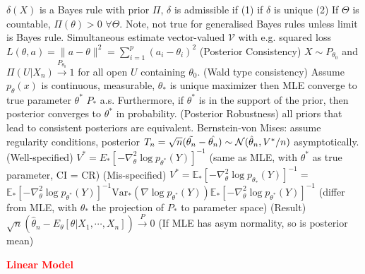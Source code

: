 \documentclass{article}
\renewcommand{\section}[1]{\textcolor{red}{\textbf{#1}}}
\renewcommand{\subsection}[1]{\text{\hl{[#1]}}}
\newcommand{\compact}{\nolinebreak}
\begin{document}
\subsection{Admissibility}
$\delta(X)$ is a Bayes rule with prior $\Pi$, $\delta$ is admissible if
(1) if $\delta$ is unique
(2) If $\Theta$ is countable, $\Pi(\theta) > 0$ $\forall \Theta$.
Note, not true for generalised Bayes rules unless limit is Bayes rule.
\compact
\subsection{Simul est}
Simultaneous estimate vector-valued $\mathcal{V}$ with e.g. squared loss
$L(\theta, a) = \|a - \theta\|^2 = \sum_{i=1}^{p} (a_i - \theta_i)^2$
\compact
\subsection{Asymptotic}
(Posterior Consistency)
$X\sim P_{\theta_0}$ and $\Pi(U|X_n) \xrightarrow{P_{\theta_0}} 1$
for all open $U$ containing $\theta_0$.
(Wald type consistency)
Assume $p_\theta(x)$ is continuous, measurable, $\theta_*$ is unique maximizer
then MLE converge to true parameter $\theta^*$ $P_*$ a.s.
Furthermore, if $\theta^\ast$ is in the support of the prior,
then posterior converges to $\theta^\ast$ in probability.
(Posterior Robustness)
all priors that lead to consistent posteriors are equivalent.
\compact
\subsection{BM}
Bernstein-von Mises: assume regularity conditions, posterior
$T_n = \sqrt{n} (\Tilde{\theta_n}-\hat{\theta_n}) \sim \mathcal{N}(\hat\theta_n, V^*/n)$
asymptotically.
(Well-specified)
$V^* = E_* \left[ -\nabla_\theta^2 \log p_{\theta^*}(Y) \right]^{-1}$
(same as MLE, with $\theta^*$ as true parameter, CI = CR)
(Mis-specified)
$V^* = \mathbb{E}_*\left[-\nabla_\theta^2\log p_{\theta_*}(Y)\right]^{-1}=$
$\mathbb{E}_*\left[-\nabla_\theta^2\log p_{\theta^*}(Y)\right]^{-1}\text{Var}_*\left(\nabla\log
    p_{\theta^*}(Y)\right)\mathbb{E}_*\left[-\nabla_\theta^2\log p_{\theta^*}(Y)\right]^{-1}$
(differ from MLE, with $\theta_*$ the projection of $P_*$ to parameter
space)
(Result)
$\sqrt{n} \left( \hat\theta_n - E_\theta[\theta | X_1, \cdots, X_n] \right)
    \xrightarrow{P} 0$ (If MLE has asym normality, so is posterior mean)

\section{Linear Model}
\end{document}
